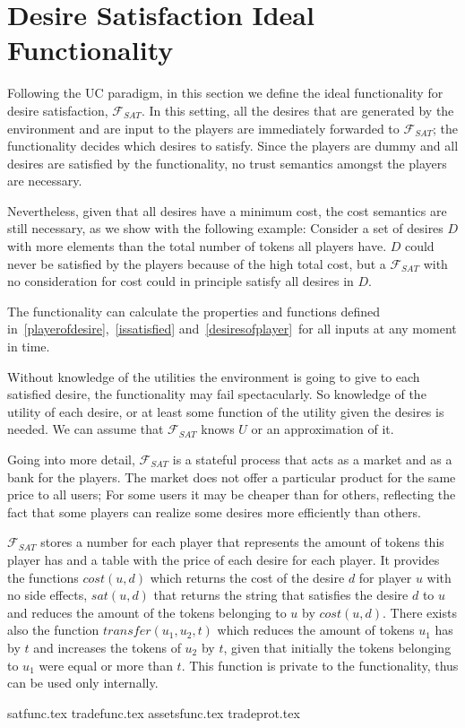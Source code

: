 \section{Desire Satisfaction Ideal Functionality}
  Following the UC paradigm, in this section we define the ideal functionality for desire
  satisfaction, $\mathcal{F}_{SAT}$.  In this setting, all the desires that are generated
  by the environment and are input to the players are immediately forwarded to
  $\mathcal{F}_{SAT}$; the functionality decides which desires to satisfy. Since the
  players are dummy and all desires are satisfied by the functionality, no trust semantics
  amongst the players are necessary.

  Nevertheless, given that all desires have a minimum cost, the cost semantics are still
  necessary, as we show with the following example: Consider a set of desires $D$ with
  more elements than the total number of tokens all players have. $D$ could never be
  satisfied by the players because of the high total cost, but a $\mathcal{F}_{SAT}$ with
  no consideration for cost could in principle satisfy all desires in $D$.

  The functionality can calculate the properties and functions defined
  in~\ref{playerofdesire},~\ref{issatisfied} and~\ref{desiresofplayer}\ for all inputs at
  any moment in time.

  Without knowledge of the utilities the environment is going to give to each satisfied
  desire, the functionality may fail spectacularly. So knowledge of the utility of each
  desire, or at least some function of the utility given the desires is needed. We can
  assume that $\mathcal{F}_{SAT}$ knows $U$ or an approximation of it.

  Going into more detail, $\mathcal{F}_{SAT}$ is a stateful process that acts as a market
  and as a bank for the players. The market does not offer a particular product for the
  same price to all users; For some users it may be cheaper than for others, reflecting
  the fact that some players can realize some desires more efficiently than others.

  $\mathcal{F}_{SAT}$ stores a number for each player that represents the amount of tokens
  this player has and a table with the price of each desire for each player. It provides
  the functions $cost\left(u, d\right)$ which returns the cost of the desire $d$ for
  player $u$ with no side effects, $sat\left(u, d\right)$ that returns the string that
  satisfies the desire $d$ to $u$ and reduces the amount of the tokens belonging to $u$ by
  $cost\left(u, d\right)$. There exists also the function $transfer\left(u_1, u_2,
  t\right)$ which reduces the amount of tokens $u_1$ has by $t$ and increases the tokens
  of $u_2$ by $t$, given that initially the tokens belonging to $u_1$ were equal or more
  than $t$. This function is private to the functionality, thus can be used only
  internally.

  {satfunc.tex}
  {tradefunc.tex}
  {assetsfunc.tex}
  {tradeprot.tex}
